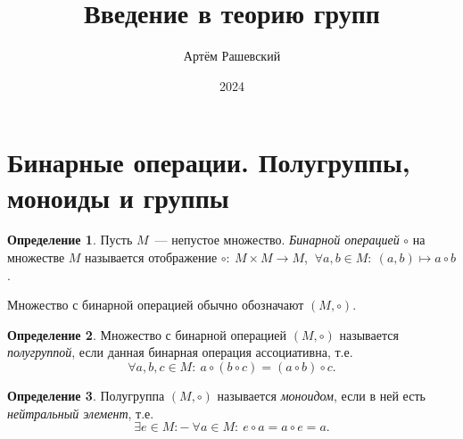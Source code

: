 \documentclass[a4paper, 14pt]{extarticle}
\title{Введение в теорию групп}
\author{Артём Рашевский}
\affil{ФКН ВГУ}
\date{2024}
\newcommand{\suchthat}{{:}{-} \ }
\theoremstyle{definition}
\newtheorem{definition}{Определение}
\theoremstyle{plain}
\numberwithin{theorem}{section}
\numberwithin{definition}{section}
\numberwithin{statement}{section}
\numberwithin{lemma}{section}
\numberwithin{consequence}{section}
\begin{document}
	
	\maketitle
	\thispagestyle{empty}
	\newpage
	\tableofcontents
	\newpage
	\section{Бинарные операции. Полугруппы, моноиды и группы}
	\begin{definition}
		Пусть $M$~--- непустое множество. \textit{Бинарной операцией} $\circ$ на множестве $M$ называется отображение 
		${\circ{:} \ M \times M \rightarrow M}$, ${\ \forall a,b \in M{:} \ (a, b) \mapsto a \circ b}$.
	\end{definition}
	
	Множество с бинарной операцией обычно обозначают $(M, \circ).$
	
	\begin{definition}
		Множество с бинарной операцией $(M, \circ)$ называется \textit{полугруппой}, если данная бинарная операция
		ассоциативна, т.е.
		\begin{equation*}
			\forall a, b, c \in M{:} \ a \circ (b \circ c) = (a \circ b) \circ c.
		\end{equation*}
	\end{definition}
	
	\begin{definition}
		Полугруппа $(M, \circ)$ называется \textit{моноидом}, если в ней есть \textit{нейтральный элемент}, т.е.
		\begin{equation*}
			\exists e \in M \suchthat \forall a \in M{:} \ e \circ a = a \circ e = a.
		\end{equation*}
	\end{definition}
	
\end{document}
